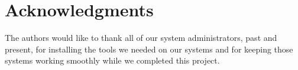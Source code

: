\documentclass[12pt]{article}
\newcommand{\singlespace}{
  \protect\renewcommand\baselinestretch{1.0}
  \protect\normalsize
}
\begin{document}
\section*{Acknowledgments}

The authors would like to thank all of our system administrators, past
and present, for installing the tools we needed on our systems and for
keeping those systems working smoothly while we completed this
project.

%
% 
\singlespace



\end{document}
